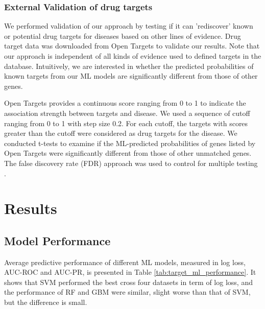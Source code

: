    \subsubsection{External Validation of drug targets}
      We performed validation of our approach by testing if it can 'rediscover' known or potential drug targets for diseases based on other lines of evidence. Drug target data was downloaded from Open Targets \cite{koscielny2017open} to validate our results. Note that our approach is independent of all kinds of evidence used to defined targets in the database. Intuitively, we are interested in whether the predicted probabilities of known targets from our ML models are significantly different from those of other genes.

      Open Targets provides a continuous score ranging from 0 to 1 to indicate the association strength between targets and disease. We used a sequence of cutoff ranging from 0 to 1 with step size 0.2. For each cutoff, the targets with scores greater than the cutoff were considered as drug targets for the disease. We conducted t-tests to examine if the ML-predicted probabilities of genes listed by Open Targets were significantly different from those of other unmatched genes. The false discovery rate (FDR) approach was used to control for multiple testing \cite{benjamini1995controlling}.

\section{Results}
  
  \subsection{Model Performance}
    Average predictive performance of different ML models, measured in log loss, AUC-ROC and AUC-PR, is presented in Table \ref{tab:target_ml_performance}. It shows that SVM performed the best cross four datasets in term of log loss, and the performance of RF and GBM were similar, slight worse than that of SVM, but the difference is small.

